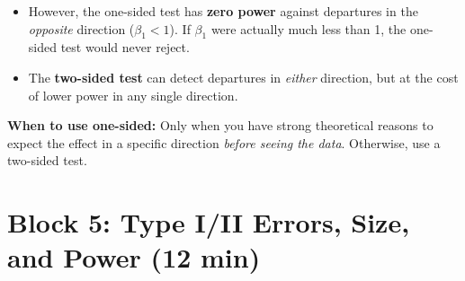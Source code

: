 \documentclass[11pt,a4paper]{article}
\begin{document}
\begin{enumerate}[label=(\alph*)]
\begin{solution}
\begin{itemize}
  \item However, the one-sided test has \textbf{zero power} against departures in the \emph{opposite} direction ($\beta_1 < 1$). If $\beta_1$ were actually much less than 1, the one-sided test would never reject.

  \item The \textbf{two-sided test} can detect departures in \emph{either} direction, but at the cost of lower power in any single direction.
\end{itemize}

\textbf{When to use one-sided:} Only when you have strong theoretical reasons to expect the effect in a specific direction \emph{before seeing the data}. Otherwise, use a two-sided test.
\end{solution}

\end{enumerate}

\section{Block 5: Type I/II Errors, Size, and Power \textnormal{(12 min)}}
\end{document}
